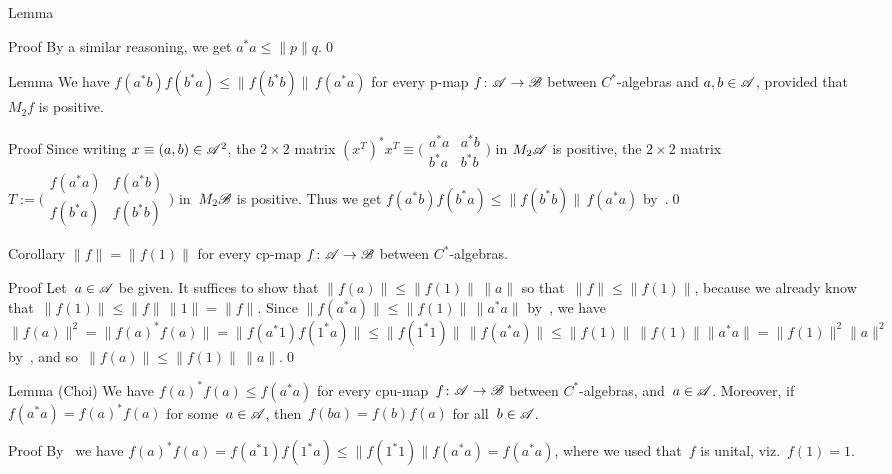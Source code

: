 \documentclass[a]{subfiles}
\begin{document}
\begin{parsec}
\begin{point}{Lemma}
\begin{point}{Proof}
By a similar reasoning, we get $a^*a\leq \|p\|q$.\qed
\end{point}
\end{point}
\begin{point}[cp-cs]{Lemma}%
We have $f(a^*b) f(b^*a)\leq \|f(b^*b)\|\,f(a^*a)$
for every p-map $f\colon \mathscr{A}\to\mathscr{B}$
between $C^*$-algebras
and $a,b\in\mathscr{A}$,
provided that $M_2f$ is positive.
\begin{point}{Proof}%
Since writing $x\equiv (a,b)\in \mathscr{A}^2$,
the $2\times 2$ matrix $(x^T)^* x^T\equiv 
	\bigl(
\begin{smallmatrix}
a^*a & a^*b \\
b^*a & b^* b
\end{smallmatrix} \bigr)$
in $M_2\mathscr{A}$
is positive,
the $2\times 2$ matrix $T:=\bigl(
\begin{smallmatrix}
	f(a^*a) & f(a^*b) \\
	f(b^*a) & f(b^* b)
\end{smallmatrix}\bigr)$
in~$M_2\mathscr{B}$ is positive.
Thus we get $f(a^*b) f(b^*a)\leq \|f(b^*b)\|\,f(a^*a)$
by~.\qed
\end{point}
\end{point}
\begin{point}{Corollary}
$\|f\|= \|f(1)\|$
for every cp-map $f\colon \mathscr{A}\to\mathscr{B}$ between $C^*$-algebras.
\begin{point}{Proof}%
Let~$a\in\mathscr{A}$ be given.
It suffices to show that $\|f(a)\|\leq \|f(1)\|\,\|a\|$
so that~$\|f\|\leq\|f(1)\|$,
because we already know that~$\|f(1)\|\leq \|f\|\,\|1\| = \|f\|$.
Since $\|f(a^*a)\|\leq \|f(1)\|\,\|a^*a\|$
by~,
we have
 $\|f(a)\|^2=\|f(a)^*f(a)\|=\|f(a^*1)f(1^*a)\|
\leq \|f(1^*1)\|\,\|f(a^*a)\|
\leq \|f(1)\|\, \|f(1)\|\|a^*a\|
= \|f(1)\|^2 \|a\|^2$
by~,
and so~$\|f(a)\|\leq \|f(1)\|\,\|a\|$.\qed
\end{point}
\end{point}
\begin{point}[choi]{Lemma (Choi)}%
We have
$f(a)^*f(a) \leq f(a^* a)$ for
every
cpu-map~$f\colon \mathscr{A}\to\mathscr{B}$ between $C^*$-algebras,
and~$a\in\mathscr{A}$.
Moreover, if $f(a^*a)=f(a)^*f(a)$
for some~$a\in\mathscr{A}$,
then~$f(ba)=f(b)f(a)$
for all~$b\in \mathscr{A}$.
\begin{point}{Proof}%
By~
we have $f(a)^*f(a)=f(a^* 1)f(1^* a) \leq
\|f(1^*1)\| f(a^*a)=f(a^*a)$,
where we used that~$f$ is unital, viz.~$f(1)=1$.


\end{point}
\end{point}
\end{parsec}
\end{document}
